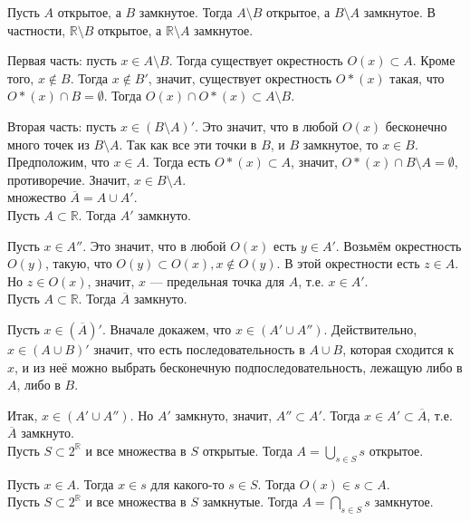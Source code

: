 \documentclass[12pt,a4paper]{article}
\begin{document}
\theorem Пусть $A$ открытое, а $B$ замкнутое. Тогда $A\setminus B$ открытое, а $B\setminus A$ замкнутое. В частности, $\mathbb R\setminus B$ открытое, а $\mathbb R\setminus A$ замкнутое.\label{openclosed}

\proof Первая часть: пусть $x\in A\setminus B$. Тогда существует окрестность $O(x)\subset A$. Кроме того, $x\not\in B$. Тогда $x\not\in B'$, значит, существует окрестность $O*(x)$ такая, что $O*(x)\cap B=\emptyset$. Тогда $O(x)\cap O*(x)\subset A\setminus B$.

Вторая часть: пусть $x\in (B\setminus A)'$. Это значит, что в любой $O(x)$ бесконечно много точек из $B\setminus A$. Так как все эти точки в $B$, и $B$ замкнутое, то $x\in B$. Предположим, что $x\in A$. Тогда есть $O*(x)\subset A$, значит, $O*(x)\cap B\setminus A=\emptyset$, противоречие. Значит, $x\in B\setminus A$.\QEDA\\

 множество $\overline{A}=A\cup A'$.\\

\lemma Пусть $A\subset \mathbb R$. Тогда $A'$ замкнуто.

\proof Пусть $x\in A''$. Это значит, что в любой $O(x)$ есть $y\in A'$. Возьмём окрестность $O(y)$, такую, что $O(y)\subset O(x),x\not\in O(y)$. В этой окрестности есть $z\in A$. Но $z\in O(x)$, значит, $x$ --- предельная точка для $A$, т.е. $x\in A'$.\QEDA\\

\lemma Пусть $A\subset \mathbb R$. Тогда $\overline{A}$ замкнуто.

\proof Пусть $x\in (\overline{A})'$. Вначале докажем, что $x\in(A'\cup A'')$. Действительно, $x\in (A\cup B)'$ значит, что есть последовательность в $A\cup B$, которая сходится к $x$, и из неё можно выбрать бесконечную подпоследовательность, лежащую либо в $A$, либо в $B$.

Итак, $x\in (A'\cup A'')$. Но $A'$ замкнуто, значит, $A''\subset A'$. Тогда $x\in A'\subset \overline{A}$, т.е. $\overline{A}$ замкнуто.\QEDA\\

\lemma Пусть $S\subset 2^{\mathbb R}$ и все множества в $S$ открытые. Тогда $A=\bigcup_{s\in S} s$ открытое.\label{opencup}

\proof Пусть $x\in A$. Тогда $x\in s$ для какого-то $s\in S$. Тогда $O(x)\in s\subset A$. \QEDA\\

\lemma Пусть $S\subset 2^{\mathbb R}$ и все множества в $S$ замкнутые. Тогда $A=\bigcap_{s\in S} s$ замкнутое.\label{closedcap}
\end{document}
